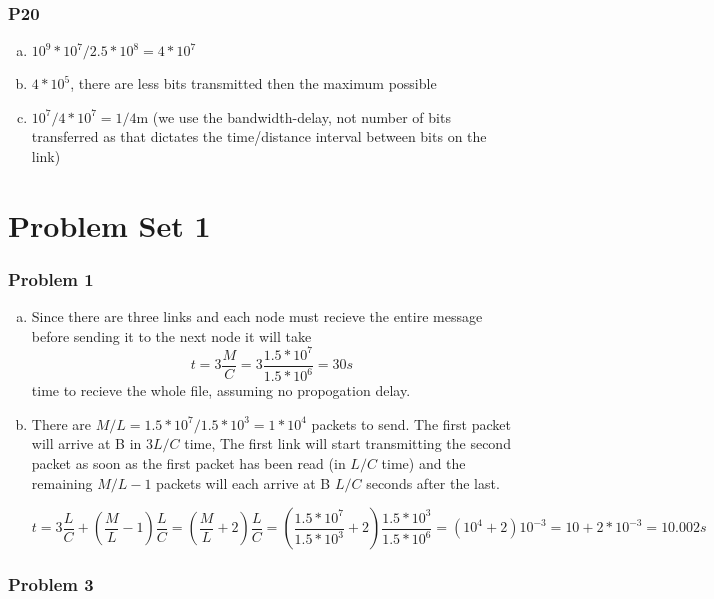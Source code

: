 \documentclass[11pt]{article}
\begin{document}
\subsubsection{P20}

\begin{enumerate}[(a)]
    \item $10^9 * 10^7 / 2.5*10^8 = 4*10^7$
    \item $4*10^5$, there are less bits transmitted then the maximum possible
    \item $10^7/4*10^7 = 1/4$m (we use the bandwidth-delay, not number of bits transferred as that dictates the time/distance interval between bits on the link)
\end{enumerate}

\section{Problem Set 1}

\subsubsection{Problem 1}

\begin{enumerate}[(a)]
    \item Since there are three links and each node must recieve the entire message before sending it to the next node it will take  \[ t = 3 \dfrac{M}{C} = 3 \dfrac{1.5*10^7}{1.5*10^6} = 30s \] time to recieve the whole file, assuming no propogation delay.
    \item There are $M/L = 1.5*10^7/1.5*10^3 = 1*10^4$ packets to send. The first packet will arrive at B in $3L/C$ time, The first link will start transmitting the second packet as soon as the first packet has been read (in $L/C$ time) and the remaining $M/L - 1$ packets will each arrive at B $L/C$ seconds after the last.
    
    \[ t = 3 \dfrac{L}{C} + \left(\dfrac{M}{L} - 1\right) \dfrac{L}{C} = \left(\dfrac{M}{L} + 2\right) \dfrac{L}{C} = \left(\dfrac{1.5*10^7}{1.5*10^3} + 2\right) \dfrac{1.5*10^3}{1.5*10^6} = (10^4 + 2) 10^{-3} = 10 + 2 * 10^{-3} = 10.002s \]
\end{enumerate}

\subsubsection{Problem 3}
\end{document}
